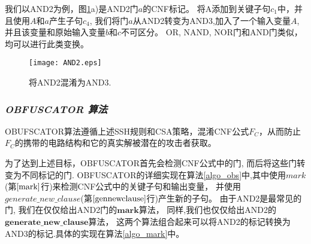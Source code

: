 我们以AND2为例，图\ref{fig_AND2}a)是AND2门$a$的CNF标记。
将A添加到关键子句$c_1$中，并且使用$A$和$a$产生子句$c_4$,
我们将门$a$从AND2转变为AND3,加入了一个输入变量$A$,
并且该变量和原始输入变量$b$和$c$不可区分。
OR, NAND, NOR门和AND门类似，均可以进行此类变换。

\begin{figure}
\footnotesize\centering
\centerline{\texttt{[image: AND2.eps]}}
\caption{将AND2混淆为AND3.}\centering
\label{fig_AND2}
\end{figure}

\subsubsection{\textsl{OBFUSCATOR 算法}}

%
OBUFSCATOR算法遵循上述SSH规则和CSA策略，混淆CNF公式$F_C$，从而防止$F_C$的携带的电路结构和它的真实解被潜在的攻击者获取。

为了达到上述目标，OBFUSCATOR首先会检测CNF公式中的门,
而后将这些门转变为不同标记的门.
OBFUSCATOR的详细实现在算法\ref{algo_obs}中,其中使用$mark$(第$\ref{mark}$行)来检测CNF公式中的关键子句和输出变量，
并使用$generate\_new\_clause$(第$\ref{gennewclause}$行)产生新的子句。
由于AND2是最常见的门,
我们在仅仅给出AND2门的$\mathbf{mark}$算法，
同样,我们也仅仅给出AND2的$\mathbf{generate\_new\_clause}$算法，
这两个算法组合起来可以将AND2的标记转换为AND3的标记.具体的实现在算法\ref{algo_mark}中。


